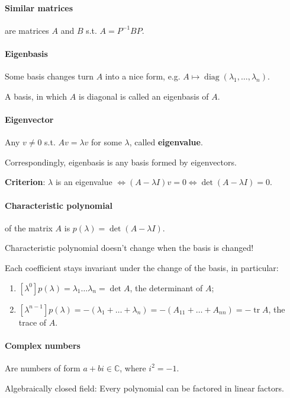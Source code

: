 \documentclass{article}
\begin{document}
\paragraph{Similar matrices} are matrices $A$ and $B$ s.t. $A = P^{-1} BP$.

\paragraph{Eigenbasis} Some basis changes turn $A$ into a nice form, e.g. $A \mapsto \operatorname{diag}(\lambda_1,\dots,\lambda_n)$.

A basis, in which $A$ is diagonal is called an eigenbasis of $A$.

\paragraph{Eigenvector} Any $v \neq 0$ s.t. $Av = \lambda v$ for some $\lambda$, called \textbf{eigenvalue}.


Correspondingly, eigenbasis is any basis formed by eigenvectors.

\textbf{Criterion}: $\lambda$ is an eigenvalue $\iff (A-\lambda I)v=0 \iff \det(A-\lambda I) =0$.

\paragraph{Characteristic polynomial} of the matrix $A$ is $p(\lambda)=\det(A-\lambda I)$.

Characteristic polynomial doesn't change when the basis is changed!

Each coefficient stays invariant under the change of the basis, in particular:

\begin{enumerate}
    \item $[\lambda^0] p(\lambda) = \lambda_1 \dots \lambda_n = \det A$, the determinant of $A$;
    \item $[\lambda^{n-1}]p(\lambda) = -(\lambda_1+\dots+\lambda_n) = -(A_{11}+\dots+A_{nn}) = -\operatorname{tr} A$, the trace of $A$.
\end{enumerate}

\paragraph{Complex numbers} Are numbers of form $a+bi \in \mathbb C$, where $i^2=-1$.

Algebraically closed field: Every polynomial can be factored in linear factors.
\end{document}
